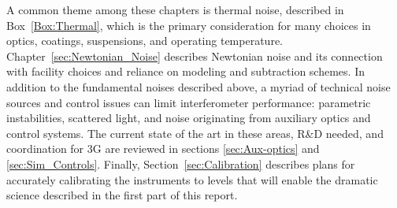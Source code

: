 A common theme among these chapters is thermal noise, described in Box~\ref{Box:Thermal}, which is the primary consideration for many choices in optics, coatings, suspensions, and operating temperature. 
Chapter~\ref{sec:Newtonian_Noise} describes Newtonian noise and its connection with facility choices and reliance on modeling and subtraction schemes. 
In addition to the fundamental noises described above, a myriad of technical noise sources and control issues can limit interferometer performance: parametric instabilities, scattered light, and noise originating from auxiliary optics and control systems. 
The current state of the art in these areas, R\&D needed, and coordination for 3G are reviewed in sections \ref{sec:Aux-optics} and \ref{sec:Sim_Controls}. 
Finally, Section~\ref{sec:Calibration} describes plans for accurately calibrating the instruments to levels that will enable the dramatic science described in the first part of this report. 

